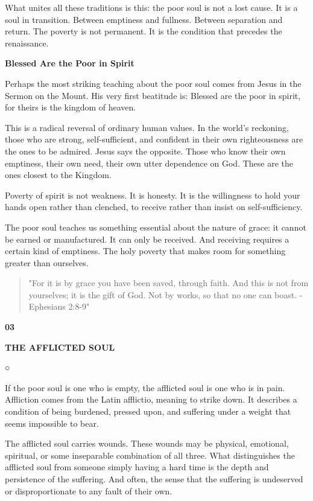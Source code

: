 What unites all these traditions is this: the poor soul is not a lost
cause. It is a soul in transition. Between emptiness and fullness.
Between separation and return. The poverty is not permanent. It is the
condition that precedes the renaissance.

\textbf{Blessed Are the Poor in Spirit}

Perhaps the most striking teaching about the poor soul comes from Jesus
in the Sermon on the Mount. His very first beatitude is: Blessed are the
poor in spirit, for theirs is the kingdom of heaven.

This is a radical reversal of ordinary human values. In the world's
reckoning, those who are strong, self-sufficient, and confident in their
own righteousness are the ones to be admired. Jesus says the opposite.
Those who know their own emptiness, their own need, their own utter
dependence on God. These are the ones closest to the Kingdom.

Poverty of spirit is not weakness. It is honesty. It is the willingness
to hold your hands open rather than clenched, to receive rather than
insist on self-sufficiency.

The poor soul teaches us something essential about the nature of grace:
it cannot be earned or manufactured. It can only be received. And
receiving requires a certain kind of emptiness. The holy poverty that
makes room for something greater than ourselves.

\begin{quote}
"For it is by grace you have been saved, through faith. And this is not
from yourselves; it is the gift of God. Not by works, so that no one can
boast. - Ephesians 2:8-9"
\end{quote}

\textbf{03}

\textbf{THE AFFLICTED SOUL}

○

If the poor soul is one who is empty, the afflicted soul is one who is
in pain. Affliction comes from the Latin afflictio, meaning to strike
down. It describes a condition of being burdened, pressed upon, and
suffering under a weight that seems impossible to bear.

The afflicted soul carries wounds. These wounds may be physical,
emotional, spiritual, or some inseparable combination of all three. What
distinguishes the afflicted soul from someone simply having a hard time
is the depth and persistence of the suffering. And often, the sense that
the suffering is undeserved or disproportionate to any fault of their
own.

